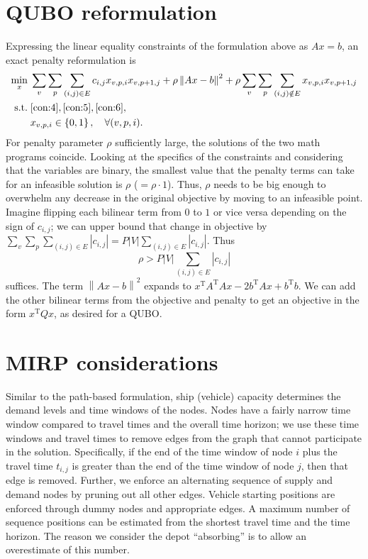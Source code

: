 \documentclass[11pt]{article}
\theoremstyle{definition}
\newcommand{\card}[1]{\left| #1 \right|}
\newcommand{\st}{\mathrm{s.t.}\;}
\newcommand{\tr}{^{\mathrm{T}}}
\newcommand{\abs}[1]{\left| #1 \right|}
\newcommand{\norm}[1]{\left\| #1 \right\|}
\newcommand{\set}[1]{\left\{ #1 \right\}}
\newcommand{\0}{\mathbf{0}}
\begin{document}
\section{QUBO reformulation}
Expressing the linear equality constraints of the formulation above as $Ax = b$, an exact penalty reformulation is
\begin{equation}
\label{qubo}
\begin{aligned}
\min_x\; & \sum_v \sum_p \sum_{(i,j) \in E} c_{i,j} x_{v,p,i} x_{v,p+1,j}  + \rho\norm{Ax - b}^2 +  \rho\sum_v \sum_p \sum_{(i,j) \notin E}  x_{v,p,i} x_{v,p+1,j} \\
\st
& \eqref{con:4}, \eqref{con:5}, \eqref{con:6}, \\
& x_{v,p,i} \in \set{0,1}, \quad \forall (v,p,i).
\end{aligned}
\end{equation}
For penalty parameter $\rho$ sufficiently large, the solutions of the two math programs coincide.
Looking at the specifics of the constraints and considering that the variables are binary, the smallest value that the penalty terms can take for an infeasible solution is $\rho$ ($=\rho\cdot 1$).
Thus, $\rho$ needs to be big enough to overwhelm any decrease in the original objective by moving to an infeasible point.
Imagine flipping each bilinear term from $0$ to $1$ or vice versa depending on the sign of $c_{i,j}$;
we can upper bound that change in objective by
$\sum_v \sum_p \sum_{(i,j) \in E} \abs{c_{i,j}} = P\card{V} \sum_{(i,j) \in E} \abs{c_{i,j}}$.
Thus 
\[
\rho > P\card{V} \sum_{(i,j) \in E} \abs{c_{i,j}}
\]
suffices.
%
The term $\norm{Ax - b}^2$ expands to $x\tr A\tr A x - 2 b\tr Ax + b\tr b$.
We can add the other bilinear terms from the objective and penalty to get an objective in the form $x\tr Q x$, as desired for a QUBO.


\section{MIRP considerations}
Similar to the path-based formulation, ship (vehicle) capacity determines the demand levels and time windows of the nodes.
Nodes have a fairly narrow time window compared to travel times and the overall time horizon;
we use these time windows and travel times to remove edges from the graph that cannot participate in the solution.
Specifically, if the end of the time window of node $i$ plus the travel time $t_{i,j}$ is greater than the end of the time window of node $j$, then that edge is removed.
Further, we enforce an alternating sequence of supply and demand nodes by pruning out all other edges.
Vehicle starting positions are enforced through dummy nodes and appropriate edges.
A maximum number of sequence positions can be estimated from the shortest travel time and the time horizon.
The reason we consider the depot ``absorbing'' is to allow an overestimate of this number.

%
\end{document}
